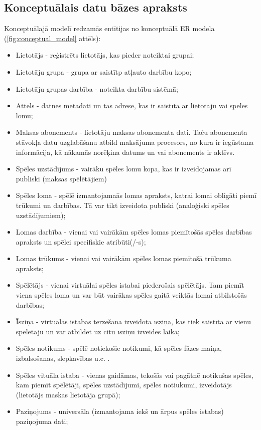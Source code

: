 \subsection{Konceptuālais datu bāzes apraksts}
Konceptuālajā modelī redzamās entītijas no konceptuālā ER modeļa (\ref{fig:conceptual_model} attēls):
\begin{itemize}
	\item Lietotājs - reģistrēts lietotājs, kas pieder noteiktai grupai;
	\item Lietotāju grupa - grupa ar saistītp atļauto darbību kopo;
	\item Lietotāju grupas darbība - noteikta darbību sistēmā;
	\item Attēls - datnes metadati un tās adrese, kas ir saistīta ar lietotāju vai spēles lomu;
	\item Maksas abonements - lietotāju maksas abonementa dati. Taču abonementa stāvokļa datu uzglabāšanu atbild maksājuma procesors, no kura ir iegūstama informācija, kā nākamās norēķina datums un vai abonements ir aktīvs.
	\item Spēles uzstādījums - vairāku spēles lomu kopa, kas ir izveidojamas arī publiski (maksas spēlētājiem)
	\item Spēles loma - spēlē izmantojamaās lomas apraksts, katrai lomai obligāti piemī trūkumi un darbības. Tā var tikt izveidota publiski (analoģiski spēles uzstādījumiem);
	\item Lomas darbība - vienai vai vairākām spēles lomas piemītošās spēles darbības apraksts un spēlei specifiskie atribūti(/-s);
	\item Lomas trūkums - vienai vai vairākām spēles lomas piemītošā trūkuma apraksts;
	\item Spēlētājs - vienai virtuālai spēles istabai piederošais spēlētājs. Tam piemīt viena spēles loma un var būt vairākas spēles gaitā veiktās lomai atbilstošās darbības;
	\item Īsziņa - virtuālās istabas terzēšanā izveidotā īsziņa, kas tiek saistīta ar vienu spēlētāju un var atbildēt uz citu īsziņu izveides laikā;
	\item Spēles notikums - spēlē notiekošie notikumi, kā spēles fāzes maiņa, izbalsošanas, slepkavības u.c. .
	\item Spēles vituāla istaba - vienas gaidāmas, tekošās vai pagātnē notikušas spēles, kam piemīt spēlētāji, spēles uzstādījumi, spēles notiukumi, izveidotājs (lietotājs maskas lietotāja grupā);
	\item Paziņojums - universāla (izmantojama iekš un ārpus spēles istabas) paziņojuma dati;
\end{itemize}


